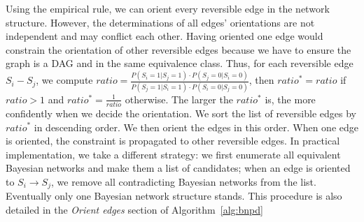 \documentclass{edm_template}
\begin{document}
Using the empirical rule, we can orient every reversible edge in the network structure. 
However, the determinations of all edges' orientations are not independent and may conflict each other.
Having oriented one edge would constrain the orientation of other reversible edges because we have to ensure the graph is a DAG and in the same equivalence class.
Thus, for each reversible edge $S_i-S_j$, we compute $ratio=\frac{P(S_i=1|S_j=1)\cdot P(S_j=0|S_i=0)}{P(S_j=1|S_i=1)\cdot P(S_i=0|S_j=0)}$,
then  $ratio^*=ratio$ if $ratio >1$ and $ratio^*=\frac{1}{ratio}$ otherwise. The larger the $ratio^*$ is, the more confidently when we decide the orientation.
We sort the list of reversible edges by $ratio^*$ in descending order. We then orient the edges in this order.
When one edge is oriented, the constraint is propagated to other reversible edges. In practical implementation, we take a different strategy: 
we first enumerate all equivalent Bayesian networks and make them a list of candidates; 
when an edge is oriented to $S_i\rightarrow S_j$, we remove all contradicting Bayesian networks from the list.
Eventually only one Bayesian network structure stands. This procedure is also detailed in the \emph{Orient edges} section of Algorithm~\ref{alg:bnpd}  
\end{document}
